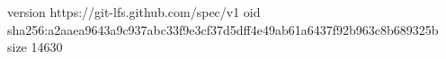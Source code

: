 version https://git-lfs.github.com/spec/v1
oid sha256:a2aaea9643a9c937abc33f9e3cf37d5dff4e49ab61a6437f92b963c8b689325b
size 14630
